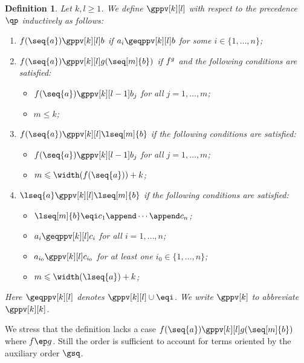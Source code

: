 \documentclass{LMCS}
\newtheorem{definition}[thm]{Definition}
\begin{document}
\begin{definition}\label{d:gppv} 
  Let $k,l \geqslant 1$.
  We define $\gppv[k][l]$ with respect to the precedence $\qp$ inductively as follows:
  \begin{enumerate}[labelsep=*,leftmargin=*]
  \item\label{d:gppv:st}
    $f(\seq{a}) \gppv[k][l] b$ if $a_i \geqppv[k][l] b$  for some $i \in \{1,\dots,n\}$;
  \item\label{d:gppv:ia}
    $f(\seq{a}) \gppv[k][l] g(\seq[m]{b})$ if $f \sp g$ and the following conditions are satisfied:
    \begin{itemize}
    \item $f(\seq{a}) \gppv[k][l-1] b_j$ for all $j = 1,\dots,m$;
    \item $m \leqslant k$;
    \end{itemize}
  \item\label{d:gppv:ialst}
    $f(\seq{a}) \gppv[k][l] \lseq[m]{b}$ if the following conditions are satisfied:
    \begin{itemize}
    \item $f(\seq{a}) \gppv[k][l-1] b_j$ for all $j = 1,\dots,m$;
    \item $m \leqslant \width(f(\seq{a})) + k$;
    \end{itemize}
  \item\label{d:gppv:ms} 
    $\lseq{a} \gppv[k][l] \lseq[m]{b}$ if the following conditions are satisfied:
    \begin{itemize}
    \item $\lseq[m]{b} \eqi c_1 \append \cdots \append c_n$;
    \item $a_i \geqppv[k][l] c_i$ for all $i = 1, \dots, n$;
    \item $a_{i_0} \gppv[k][l] c_{i_0}$ for at least one $i_0 \in \{1, \dots, n\}$;
    \item $m \leqslant \width(\lseq{a}) + k$;
    \end{itemize}
  \end{enumerate}
  Here ${\geqppv[k][l]}$ denotes ${\gppv[k][l]} \cup {\eqi}$.  We write
  $\gppv[k]$ to abbreviate $\gppv[k][k]$.
\end{definition}

We stress that the definition
lacks a case $f(\seq{a}) \gppv[k][l] g(\seq[m]{b})$ where $f \ep g$.
Still the order is sufficient to account for 
terms oriented by the auxiliary order $\gsq$.
\end{document}
